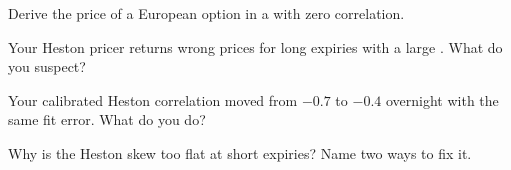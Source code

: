 \begin{interviewq}\label{iq:dv:stochastic-volatility:3}
Derive the price of a European option in a  with zero correlation.
\end{interviewq}

\begin{interviewq}\label{iq:dv:stochastic-volatility:4}
Your Heston pricer returns wrong prices for long expiries with a large . What do you suspect?
\end{interviewq}

\begin{interviewq}\label{iq:dv:stochastic-volatility:5}
Your calibrated Heston correlation moved from $-0.7$ to $-0.4$ overnight with the same fit error. What do you do?
\end{interviewq}

\begin{interviewq}\label{iq:dv:stochastic-volatility:6}
Why is the Heston skew too flat at short expiries? Name two ways to fix it.
\end{interviewq}
